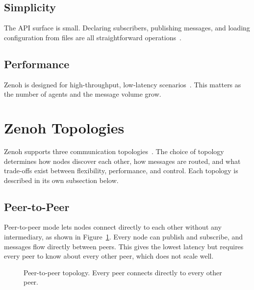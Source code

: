 \documentclass[11pt,a4paper]{article}
\begin{document}
\subsection{Simplicity}
The API surface is small. Declaring subscribers, publishing messages,
and loading configuration from files are all straightforward
operations~\citep{zenoh-config}.

\subsection{Performance}
Zenoh is designed for high-throughput, low-latency
scenarios~\citep{zenoh-firesong}. This matters as the number of
agents and the message volume grow.

\section{Zenoh Topologies}

Zenoh supports three communication
topologies~\citep{zenoh-deployment}. The choice of topology
determines how nodes discover each other, how messages are routed,
and what trade-offs exist between flexibility, performance, and
control. Each topology is described in its own subsection below.

\subsection{Peer-to-Peer}

Peer-to-peer mode lets nodes connect directly to each other without
any intermediary, as shown in Figure~\ref{fig:topology-p2p}. Every
node can publish and subscribe, and messages flow directly between
peers. This gives the lowest latency but requires every peer to know
about every other peer, which does not scale well.

\begin{figure}[H]
  \centering
  \caption{Peer-to-peer topology. Every peer connects directly to
  every other peer.}
  \label{fig:topology-p2p}
\end{figure}
\end{document}
